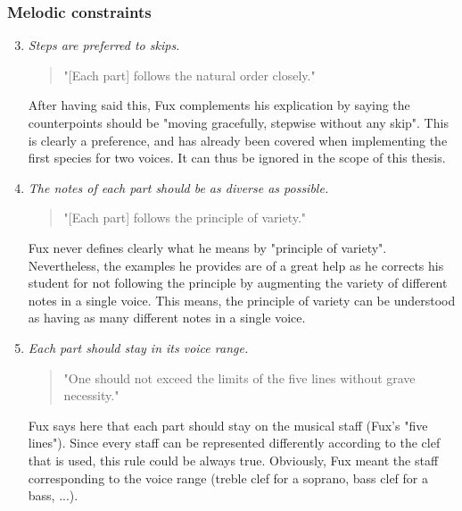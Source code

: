 \subsubsection{Melodic constraints}
\begin{enumerate}[wide, label=\bfseries 1.M\arabic*]
\setcounter{enumi}{2} %
    \item\label{rule:steps-prefered} \textit{Steps are preferred to skips.}

    \begin{quotation}
    "[Each part] follows the natural order closely."
    \textcite[p.73]{GaPEng}
    \end{quotation}

    After having said this, Fux complements his explication by saying the counterpoints should be "moving gracefully, stepwise without any skip". This is clearly a preference, and has already been covered when implementing the first species for two voices. It can thus be ignored in the scope of this thesis.

    \item\label{rule:variety} \reddot \textit{The notes of each part should be as diverse as possible.}

    \begin{quotation}
    "[Each part] follows the principle of variety."
    \textcite[p.73]{GaPEng}
    \end{quotation}

    Fux never defines clearly what he means by "principle of variety". Nevertheless, the examples he provides are of a great help as he corrects his student for not following the principle by augmenting the variety of different notes in a single voice. This means, the principle of variety can be understood as having as many different notes in a single voice. 

    \item\label{rule:each-part-should-stay-in-its-voice-range} \reddot \textit{Each part should stay in its voice range.}

    \begin{quotation}
    "One should not exceed the limits of the five lines without grave necessity."
    \textcite[p.79]{GaPEng}
    \end{quotation}

    Fux says here that each part should stay on the musical staff (Fux's "five lines"). Since every staff can be represented differently according to the clef that is used, this rule could be always true. Obviously, Fux meant the staff corresponding to the voice range (treble clef for a soprano, bass clef for a bass, ...). 
    

\end{enumerate}
